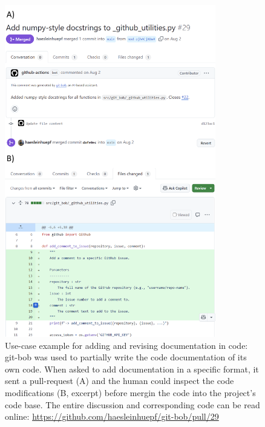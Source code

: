 \documentclass{ecai}
\begin{document}
\begin{figure}[h]
\centering
\includegraphics[width=0.82\textwidth]{example_add_documentation.png}
\caption{Use-case example for adding and revising documentation in code: git-bob was used to partially write the code documentation of its own code. When asked to add documentation in a specific format, it sent a pull-request (A) and the human could inspect the code modifications (B, excerpt) before mergin the code into the project's code base. The entire discussion and corresponding code can be read online: \url{https://github.com/haesleinhuepf/git-bob/pull/29}
\newline
\newline
}
\label{fig:example_add_documentation}
\end{figure}
\end{document}
